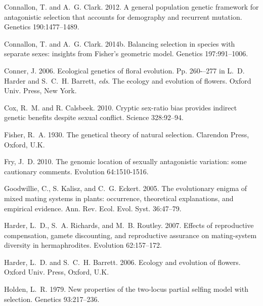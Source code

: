 \documentclass{article}
\begin{document}
\begin{thebibliography}{}
Connallon, T. and A.~G. Clark. 2012.
\newblock A general population genetic framework for antagonistic selection that accounts for demography and recurrent mutation.
\newblock Genetics 190:1477--1489.

Connallon, T. and A.~G. Clark. 2014b.
\newblock Balancing selection in species with separate sexes: insights from Fisher's geometric model.
\newblock Genetics 197:991--1006.

Conner, J. 2006.
\newblock Ecological genetics of floral evolution.
\newblock Pp. 260-–277 in L.~D. Harder and S.~C.~H. Barrett, \textit{eds}. The ecology and evolution of flowers. Oxford Univ. Press, New York.

Cox, R.~M. and R. Calsbeek. 2010.
\newblock Cryptic sex-ratio bias provides indirect genetic benefits despite sexual conflict.
\newblock Science 328:92--94.

Fisher, R.~A. 1930.
\newblock The genetical theory of natural selection.
\newblock Clarendon Press, Oxford, U.K.

Fry, J.~D. 2010.
\newblock The genomic location of sexually antagonistic variation: some cautionary comments.
\newblock Evolution 64:1510-1516.

Goodwillie, C., S. Kalisz, and C.~G. Eckert. 2005.
\newblock The evolutionary enigma of mixed mating systems in plants: occurrence, theoretical explanations, and empirical evidence.
\newblock Ann. Rev. Ecol. Evol. Syst. 36:47--79.

Harder, L.~D., S.~A. Richards, and M.~B. Routley. 2007.
\newblock Effects of reproductive compensation, gamete discounting, and reproductive assurance on mating-system diversity in hermaphrodites.
\newblock Evolution 62:157--172.

Harder, L.~D. and S.~C.~H. Barrett. 2006.
\newblock Ecology and evolution of flowers.
\newblock Oxford Univ. Press, Oxford, U.K.

Holden, L.~R. 1979.
\newblock New properties of the two-locus partial selfing model with selection.
\newblock Genetics 93:217--236.


\end{thebibliography}
\end{document}
